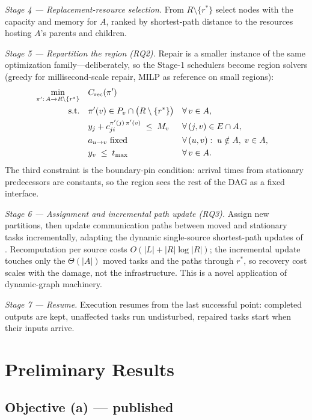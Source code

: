\documentclass[11pt]{article}
\begin{document}
\emph{Stage 4 --- Replacement-resource selection.} From
$R\setminus\{r^{*}\}$ select nodes with the capacity and memory
for $A$, ranked by shortest-path distance to the resources
hosting $A$'s parents and children.

\emph{Stage 5 --- Repartition the region (RQ2).} Repair is a
smaller instance of the same optimization family---deliberately,
so the Stage-1 schedulers become region solvers (greedy for
millisecond-scale repair, MILP as reference on small regions):
\begin{align}
\min_{\pi':\,A\rightarrow R\setminus\{r^{*}\}}\quad
& C_{\mathrm{rec}}(\pi') \label{eq:repair}\\
\text{s.t.}\quad
& \pi'(v)\in P_v\cap\bigl(R\setminus\{r^{*}\}\bigr)
  && \forall\, v\in A, \notag\\
& y_j + c_{ji}^{\pi'(j)\,\pi'(v)} \;\le\; M_v
  && \forall\, (j,v)\in E\cap A, \notag\\
& a_{u\rightarrow v} \text{ fixed}
  && \forall\, (u,v):\; u\notin A,\; v\in A, \notag\\
& y_v \;\le\; t_{\max} && \forall\, v\in A. \notag
\end{align}
The third constraint is the boundary-pin condition: arrival
times from stationary predecessors are constants, so the region
sees the rest of the DAG as a fixed interface.

\emph{Stage 6 --- Assignment and incremental path update (RQ3).}
Assign new partitions, then update communication paths between
moved and stationary tasks incrementally, adapting the dynamic
single-source shortest-path updates of
\cite{riazi2018sssp,khanda2021sssp}. Recomputation per source
costs $O(|L|+|R|\log|R|)$; the incremental update touches only
the $\Theta(|A|)$ moved tasks and the paths through $r^{*}$, so
recovery cost scales with the damage, not the infrastructure.
This is a novel application of dynamic-graph machinery.

\emph{Stage 7 --- Resume.} Execution resumes from the last
successful point: completed outputs are kept, unaffected tasks
run undisturbed, repaired tasks start when their inputs arrive.

\section{Preliminary Results}
\label{sec:prelim}

\subsection{Objective (a) --- published}
\end{document}
